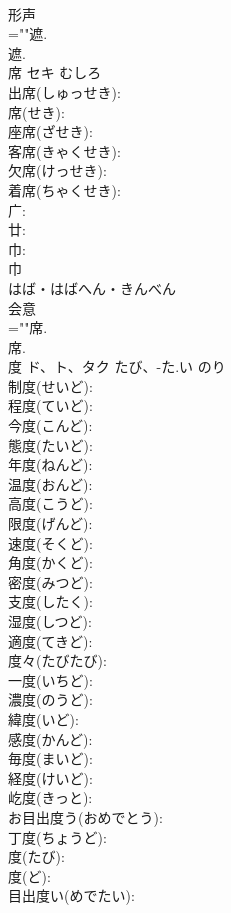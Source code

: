 \documentclass[8pt]{extreport}
\begin{document}
\begin{CJK}{UTF8}{min}
\\	形声 
\\	=""遮.
\\	遮.
\\	席	セキ	むしろ		
\\	出席(しゅっせき): 
\\	席(せき): 
\\	座席(ざせき): 
\\	客席(きゃくせき): 
\\	欠席(けっせき): 
\\	着席(ちゃくせき): 
\\	广: 
\\	廿: 
\\	巾: 
\\	巾	
\\	はば・はばへん・きんべん	
\\	会意 
\\	=""席.
\\	席.
\\	度	ド、ト、タク	たび、-た.い	のり	
\\	制度(せいど): 
\\	程度(ていど): 
\\	今度(こんど): 
\\	態度(たいど): 
\\	年度(ねんど): 
\\	温度(おんど): 
\\	高度(こうど): 
\\	限度(げんど): 
\\	速度(そくど): 
\\	角度(かくど): 
\\	密度(みつど): 
\\	支度(したく): 
\\	湿度(しつど): 
\\	適度(てきど): 
\\	度々(たびたび): 
\\	一度(いちど): 
\\	濃度(のうど): 
\\	緯度(いど): 
\\	感度(かんど): 
\\	毎度(まいど): 
\\	経度(けいど): 
\\	屹度(きっと): 
\\	お目出度う(おめでとう): 
\\	丁度(ちょうど): 
\\	度(たび): 
\\	度(ど): 
\\	目出度い(めでたい): 

\end{CJK}
\end{document}

